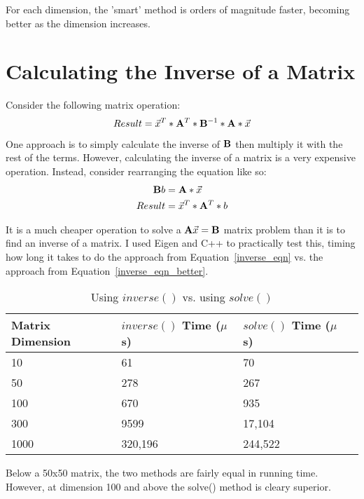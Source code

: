 \documentclass[report,12pt,notitlepage,onecolumn]{article}
\begin{document}
For each dimension, the 'smart' method is orders of magnitude faster, becoming better as the dimension increases.

\section{Calculating the Inverse of a Matrix}

Consider the following matrix operation:
\begin{equation}\label{inverse_eqn}
Result = \vec{x}^{T} * \mathbf{A}^{T} * \mathbf{B}^{-1} * \mathbf{A} * \vec{x}
\end{equation}

One approach is to simply calculate the inverse of $\mathbf{B}$ then multiply it with the rest of the terms. However, calculating the inverse of a matrix is a very expensive operation. Instead, consider rearranging the equation like so:
\begin{equation}
\begin{split}\label{inverse_eqn_better}
\mathbf{B}b &=  \mathbf{A} * \vec{x} \\
Result &= \vec{x}^{T} * \mathbf{A}^{T} * b
\end{split}
\end{equation}

It is a much cheaper operation to solve a $\mathbf{A}\vec{x} = \mathbf{B}$ matrix problem than it is to find an inverse of a matrix. I used Eigen and C++ to practically test this, timing how long it takes to do the approach from Equation~\ref{inverse_eqn} vs. the approach from Equation~\ref{inverse_eqn_better}.

\begin{table}[!h]
	\begin{tabular}{| l | l | l | l |}
		\hline
		Matrix Dimension & $inverse()$ Time ($\mu$s) & $solve()$ Time ($\mu$s) \\ \hline
		10 & 61 & 70 \\ \hline
		50 & 278 & 267  \\ \hline
		100 & 670 & 935  \\ \hline
		300 & 9599 & 17,104  \\ \hline
		1000 & 320,196 & 244,522 \\
		\hline
	\end{tabular}
	\caption{Using $inverse()$ vs. using $solve()$\label{data_inverse}}
\end{table}

Below a 50x50 matrix, the two methods are fairly equal in running time. However, at dimension 100 and above the solve() method is cleary superior.
\end{document}
